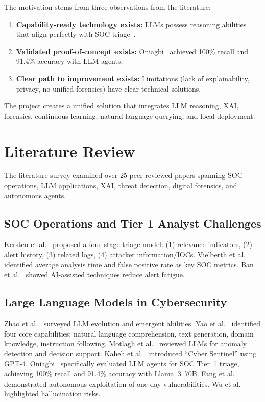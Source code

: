 \documentclass[12pt,a4paper]{report}
\begin{document}
The motivation stems from three observations from the literature:
\begin{enumerate}
    \item \textbf{Capability-ready technology exists:} LLMs possess reasoning abilities that align perfectly with SOC triage~\cite{zhao2023,yao2024}.
    \item \textbf{Validated proof-of-concept exists:} Oniagbi~\cite{oniagbi2024} achieved 100\% recall and 91.4\% accuracy with LLM agents.
    \item \textbf{Clear path to improvement exists:} Limitations (lack of explainability, privacy, no unified forensics) have clear technical solutions.
\end{enumerate}
The project creates a unified solution that integrates LLM reasoning, XAI, forensics, continuous learning, natural language querying, and local deployment.

\chapter{Literature Review}

The literature survey examined over 25 peer-reviewed papers spanning SOC operations, LLM applications, XAI, threat detection, digital forensics, and autonomous agents.

\section{SOC Operations and Tier 1 Analyst Challenges}
Kersten et al.~\cite{kersten2023} proposed a four-stage triage model: (1) relevance indicators, (2) alert history, (3) related logs, (4) attacker information/IOCs. Vielberth et al.~\cite{vielberth2020} identified average analysis time and false positive rate as key SOC metrics. Ban et al.~\cite{ban2021} showed AI-assisted techniques reduce alert fatigue.

\section{Large Language Models in Cybersecurity}
Zhao et al.~\cite{zhao2023} surveyed LLM evolution and emergent abilities. Yao et al.~\cite{yao2024} identified four core capabilities: natural language comprehension, text generation, domain knowledge, instruction following. Motlagh et al.~\cite{motlagh2024} reviewed LLMs for anomaly detection and decision support. Kaheh et al.~\cite{kaheh2023} introduced ``Cyber Sentinel'' using GPT-4. Oniagbi~\cite{oniagbi2024} specifically evaluated LLM agents for SOC Tier~1 triage, achieving 100\% recall and 91.4\% accuracy with Llama~3~70B. Fang et al.~\cite{fang2024} demonstrated autonomous exploitation of one-day vulnerabilities. Wu et al.~\cite{wu2023} highlighted hallucination risks.
\end{document}

